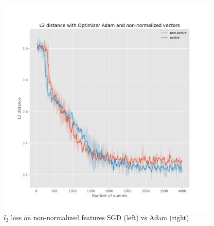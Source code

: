 \documentclass{article}
\begin{document}
\begin{figure}[!h]
\begin{minipage}{.45\textwidth}
    \includegraphics[width=\linewidth]{active-vs-base-moons-l2-loss-Adam-non-normalized-ci}
  \end{minipage}
  \caption{$l_2$ loss on non-normalized features SGD (left) vs Adam (right)}\label{fig:l2-loss-non-normalized-ci}
\end{figure}
\end{document}
